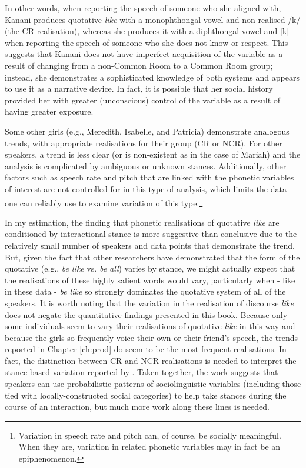 In other words, when reporting the speech of someone who she aligned with, Kanani produces quotative \textit{like} with a monophthongal vowel and non-realised /k/ (the CR realisation), whereas she produces it with a diphthongal vowel and [k] when reporting the speech of someone who she does not know or respect.  This suggests that Kanani does not have imperfect acquisition of the variable as a result of changing from a non-Common Room to a Common Room group; instead, she demonstrates a sophisticated knowledge of both systems and appears to use it as a narrative device. In fact, it is possible that her social history provided her with greater (unconscious) control of the variable as a result of having greater exposure.

Some other girls (e.g., Meredith, Isabelle, and Patricia) demonstrate analogous trends, with appropriate realisations for their group (CR or NCR).  For other speakers, a trend is less clear (or is non-existent as in the case of Mariah) and the analysis is complicated by ambiguous or unknown stances.  Additionally, other factors such as speech rate and pitch that are linked with the phonetic variables of interest are not controlled for in this type of analysis, which limits the data one can reliably use to examine variation of this type.\footnote{Variation in speech rate and pitch can, of course, be socially meaningful.  When they are, variation in related phonetic variables may in fact be an epiphenomenon.}  

In my estimation, the finding that phonetic realisations of quotative \textit{like} are conditioned by interactional stance is more suggestive than conclusive due to the relatively small number of speakers and data points that demonstrate the trend. But, given the fact that other researchers have demonstrated that the form of the quotative (e.g., \textit{be like} vs. \textit{be all}) varies by stance, we might actually expect that the realisations of these highly salient words would vary, particularly when - like in these data - \textit{be like} so strongly dominates the quotative system of all of the speakers.  It is worth noting that the variation in the realisation of discourse \textit{like} does not negate the quantitative findings presented in this book.  Because only some individuals seem to vary their realisations of quotative \textit{like} in this way and because the girls so frequently voice their own or their friend's speech, the trends reported in Chapter \ref{ch:prod} do seem to be the most frequent realisations.  In fact, the distinction between CR and NCR realisations is needed to interpret the stance-based variation reported by \citet{dragerinpress-DPVC}.  Taken together, the work suggests that speakers can use probabilistic patterns of sociolinguistic variables (including those tied with locally-constructed social categories) to help take stances during the course of an interaction, but much more work along these lines is needed.




